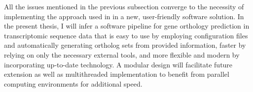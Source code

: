 All the issues mentioned in the previous subsection converge to the necessity of
implementing the approach used in \hamstr in a new, user-friendly software
solution. In the present thesis, I will infer a software pipeline for gene
orthology prediction in transcriptomic sequence data that is easy to use by
employing configuration files and automatically generating ortholog sets from
provided information, faster by relying on only the necessary external tools,
and more flexible and modern by incorporating up-to-date technology. A modular
design will facilitate future extension as well as multithreaded implementation
to benefit from parallel computing environments for additional speed.

